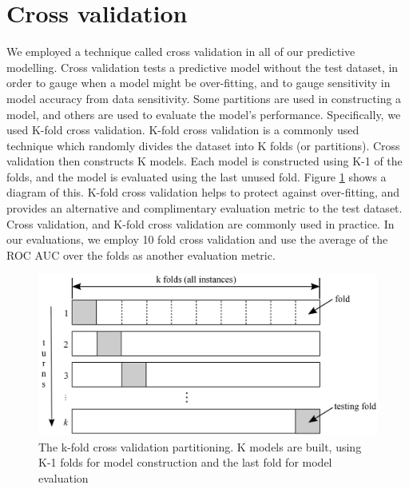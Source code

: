 \section{Cross validation}
We employed a technique called cross validation in all of our predictive modelling. Cross validation tests a predictive model without the test dataset, in order to gauge when a model might be over-fitting, and to gauge sensitivity in model accuracy from data sensitivity. Some partitions are used in constructing a model, and others are used to evaluate the model's performance. Specifically, we used K-fold cross validation. K-fold cross validation is a commonly used technique which randomly divides the dataset into K folds (or partitions). Cross validation then constructs K models. Each model is constructed using K-1 of the folds, and the model is evaluated using the last unused fold. Figure \ref{fig:cross_validation} shows a diagram of this. K-fold cross validation helps to protect against over-fitting, and provides an alternative and complimentary evaluation metric to the test dataset. Cross validation, and K-fold cross validation are commonly used in practice. In our evaluations, we employ 10 fold cross validation and use the average of the ROC AUC over the folds as another evaluation metric.

\begin{figure}[ht!]
  \caption{The k-fold cross validation partitioning. K models are built, using K-1 folds for model construction and the last fold for model evaluation}\label{fig:cross_validation}
  \centering
    \includegraphics[width=1.0\textwidth]{figures/cross_validation.png}
\end{figure}